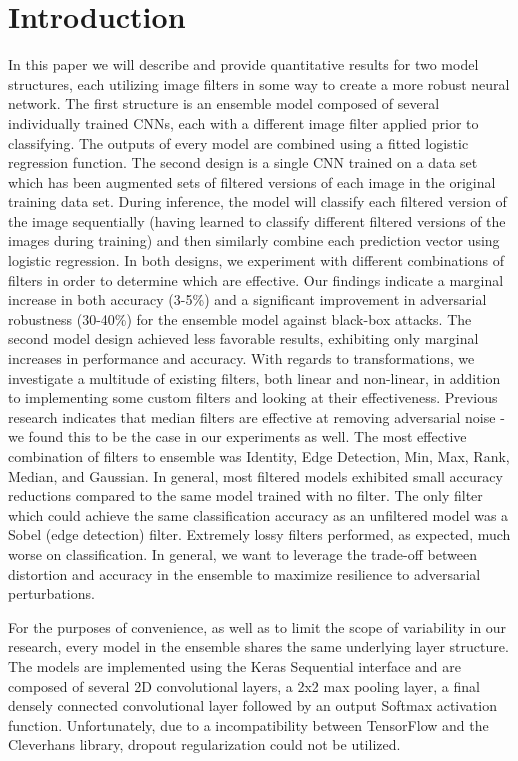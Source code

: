 \section{Introduction} \label{s:introduction}
In this paper we will describe and provide quantitative results for two model structures, each utilizing image filters in some way to create a more robust neural network.
The first structure is an ensemble model composed of several individually trained CNNs, each with a different image filter applied prior to classifying.
The outputs of every model are combined using a fitted logistic regression function.
The second design is a single CNN trained on a data set which has been augmented sets of filtered versions of each image in the original training data set.
During inference, the model will classify each filtered version of the image sequentially (having learned to classify different filtered versions of the images during training) and then similarly combine each prediction vector using logistic regression.
In both designs, we experiment with different combinations of filters in order to determine which are effective.
Our findings indicate a marginal increase in both accuracy (3-5\%) and a significant improvement in adversarial robustness (30-40\%) for the ensemble model against black-box attacks.
The second model design achieved less favorable results, exhibiting only marginal increases in performance and accuracy.
With regards to transformations, we investigate a multitude of existing filters, both linear and non-linear, in addition to implementing some custom filters and looking at their effectiveness.
Previous research indicates that median filters are effective at removing adversarial noise \cite{osadchy2016} - we found this to be the case in our experiments as well.
The most effective combination of filters to ensemble was Identity, Edge Detection, Min, Max, Rank, Median, and Gaussian.
In general, most filtered models exhibited small accuracy reductions compared to the same model trained with no filter.
The only filter which could achieve the same classification accuracy as an unfiltered model was a Sobel (edge detection) filter.
Extremely lossy filters performed, as expected, much worse on classification.
In general, we want to leverage the trade-off between distortion and accuracy in the ensemble to maximize resilience to adversarial perturbations.

For the purposes of convenience, as well as to limit the scope of variability in our research, every model in the ensemble shares the same underlying layer structure.
The models are implemented using the Keras Sequential interface and are composed of several 2D convolutional layers, a 2x2 max pooling layer, a final densely connected convolutional layer followed by an output Softmax activation function.
Unfortunately, due to a incompatibility between TensorFlow and the Cleverhans library, dropout regularization could not be utilized.
